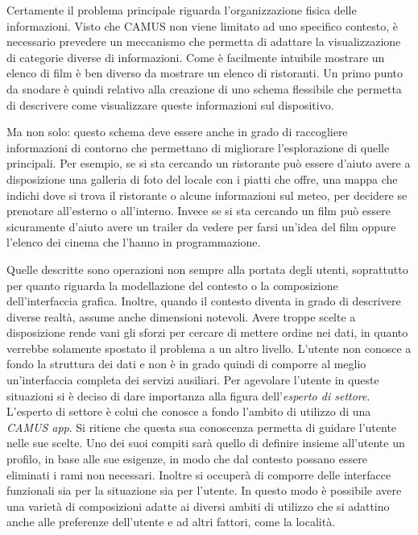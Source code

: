 Certamente il problema principale riguarda l'organizzazione fisica delle informazioni. Visto che CAMUS non viene limitato ad uno specifico contesto, è necessario prevedere un meccanismo che permetta di adattare la visualizzazione di categorie diverse di informazioni. Come è facilmente intuibile mostrare un elenco di film è ben diverso da mostrare un elenco di ristoranti. Un primo punto da snodare è quindi relativo alla creazione di uno schema flessibile che permetta di descrivere come visualizzare queste informazioni sul dispositivo.

Ma non solo: questo schema deve essere anche in grado di raccogliere informazioni di contorno che permettano di migliorare l'esplorazione di quelle principali. Per esempio, se si sta cercando un ristorante può essere d'aiuto avere a disposizione una galleria di foto del locale con i piatti che offre, una mappa che indichi dove si trova il ristorante o alcune informazioni sul meteo, per decidere se prenotare all'esterno o all'interno. Invece se si sta cercando un film può essere sicuramente d'aiuto avere un trailer da vedere per farsi un'idea del film oppure l'elenco dei cinema che l'hanno in programmazione.

Quelle descritte sono operazioni non sempre alla portata degli utenti, soprattutto per quanto riguarda la modellazione del contesto o la composizione dell'interfaccia grafica. Inoltre, quando il contesto diventa in grado di descrivere diverse realtà, assume anche dimensioni notevoli. Avere troppe scelte a disposizione rende vani gli sforzi per cercare di mettere ordine nei dati, in quanto verrebbe solamente spostato il problema a un altro livello. L'utente non conosce a fondo la struttura dei dati e non è in grado quindi di comporre al meglio un'interfaccia completa dei servizi ausiliari. Per agevolare l'utente in queste situazioni si è deciso di dare importanza alla figura dell'\emph{esperto di settore}. L'esperto di settore è colui che conosce a fondo l'ambito di utilizzo di una \emph{CAMUS app}. Si ritiene che questa sua conoscenza permetta di guidare l'utente nelle sue scelte. Uno dei suoi compiti sarà quello di definire insieme all'utente un profilo, in base alle sue esigenze, in modo che dal contesto possano essere eliminati i rami non necessari. Inoltre si occuperà di comporre delle interfacce funzionali sia per la situazione sia per l'utente. In questo modo è possibile avere una varietà di composizioni adatte ai diversi ambiti di utilizzo che si adattino anche alle preferenze dell'utente e ad altri fattori, come la località.

